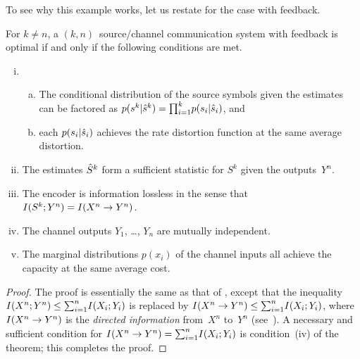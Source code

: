To see why this example works, let us restate  for the case with
feedback. 
\begin{theorem}
  \label{thm:tcntcfb}
  For $k \ne n$, a $(k, n)$~source/channel communication system with feedback is
  optimal if and only if the following conditions are met.
  \begin{enumerate}[(i)]
    \item
      \begin{enumerate}[(a)]
        \item The conditional distribution of the source symbols given the
          estimates can be factored as $p(s^k|{\hat{s}}^k) = {\prod_{i=1}^k} p(s_i|{\hat{s}}_i)$, and
        \item each $p(s_i|{\hat{s}}_i)$ achieves the rate distortion function at the
          same average distortion.
      \end{enumerate}

    \item The estimates ${\hat{S}}^k$ form a sufficient statistic for $S^k$ given the
      outputs~$Y^n$.

    \item The encoder is information lossless in the sense that $I(S^k; Y^n) =
      I(X^n \rightarrow Y^n)$. 

    \item The channel outputs $Y_1$, \ldots, $Y_n$ are mutually independent.

    \item The marginal distributions $p(x_i)$ of the channel inputs all achieve
      the capacity at the same average cost.
  \end{enumerate}
\end{theorem}

\begin{proof}
  The proof is essentially the same as that of , except that the
  inequality $I(X^n;Y^n) \le {\sum_{i=1}^n} I(X_i; Y_i)$ is replaced by $I(X^n \rightarrow Y^n) \le
  {\sum_{i=1}^n} I(X_i; Y_i)$, where $I(X^n \rightarrow Y^n)$ is the \emph{directed information}
  from~$X^n$ to~$Y^n$ (see~\cite{Massey1990,Kramer1998}). A necessary and
  sufficient condition for $I(X^n \rightarrow Y^n) = {\sum_{i=1}^n} I(X_i; Y_i)$ is condition~(iv)
  of the theorem; this completes the proof.
\end{proof}

